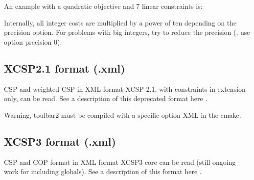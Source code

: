 \documentclass[letterpaper,10pt,openany,oneside,english]{sphinxmanual}
\begin{document}
\sphinxAtStartPar
An example with a quadratic objective and 7 linear constraints is:

\begin{sphinxVerbatim}[commandchars=\\\{\}]
      
     
     
     
     
     
     
         
\end{sphinxVerbatim}

\sphinxAtStartPar
Internally, all integer costs are multiplied by a power of ten depending on the \sphinxhyphen{}precision option.
For problems with big integers, try to reduce the precision (, use option \sphinxhyphen{}precision 0).

\sphinxstepscope


\subsection{XCSP2.1 format (.xml)}
\label{\detokenize{formats/xmlformat:xcsp2-1-format-xml}}\label{\detokenize{formats/xmlformat:xml-format}}\label{\detokenize{formats/xmlformat::doc}}
\sphinxAtStartPar
CSP and weighted CSP in XML format XCSP 2.1, with constraints in extension only, can be read. See a description of this deprecated format here .

\sphinxAtStartPar
Warning, toulbar2 must be compiled with a specific option XML in the cmake.


\subsection{XCSP3 format (.xml)}
\label{\detokenize{formats/xmlformat:xcsp3-format-xml}}
\sphinxAtStartPar
CSP and COP format in XML format XCSP3 core can be read (still on\sphinxhyphen{}going work for including globals). See a description of this format here .
\end{document}
